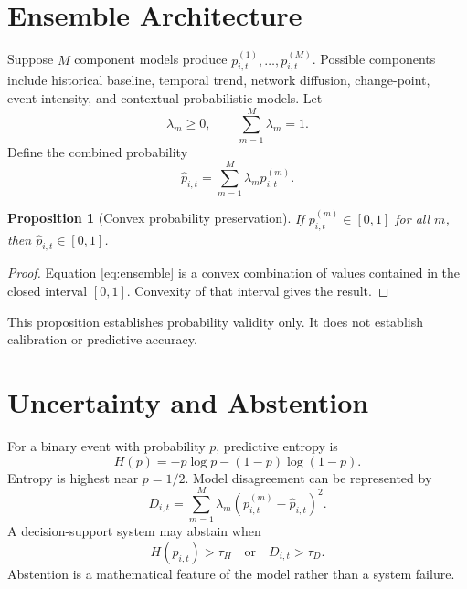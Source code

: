 \documentclass[11pt,letterpaper]{article}
\newtheorem{proposition}{Proposition}
\begin{document}
\section{Ensemble Architecture}
Suppose $M$ component models produce $p_{i,t}^{(1)},\ldots,p_{i,t}^{(M)}$. Possible components include historical baseline, temporal trend, network diffusion, change-point, event-intensity, and contextual probabilistic models. Let
\begin{equation}
\lambda_m\geq0,\qquad \sum_{m=1}^{M}\lambda_m=1.
\end{equation}
Define the combined probability
\begin{equation}
\widehat p_{i,t}=\sum_{m=1}^{M}\lambda_m p_{i,t}^{(m)}.
\label{eq:ensemble}
\end{equation}

\begin{proposition}[Convex probability preservation]
If $p_{i,t}^{(m)}\in[0,1]$ for all $m$, then $\widehat p_{i,t}\in[0,1]$.
\end{proposition}
\begin{proof}
Equation \cref{eq:ensemble} is a convex combination of values contained in the closed interval $[0,1]$. Convexity of that interval gives the result.
\end{proof}

This proposition establishes probability validity only. It does not establish calibration or predictive accuracy.

\section{Uncertainty and Abstention}
For a binary event with probability $p$, predictive entropy is
\begin{equation}
H(p)=-p\log p-(1-p)\log(1-p).
\end{equation}
Entropy is highest near $p=1/2$. Model disagreement can be represented by
\begin{equation}
D_{i,t}=\sum_{m=1}^{M}\lambda_m\left(p_{i,t}^{(m)}-\widehat p_{i,t}\right)^2.
\end{equation}
A decision-support system may abstain when
\begin{equation}
H(\widehat p_{i,t})>\tau_H
\quad\text{or}\quad
D_{i,t}>\tau_D.
\end{equation}
Abstention is a mathematical feature of the model rather than a system failure.
\end{document}
